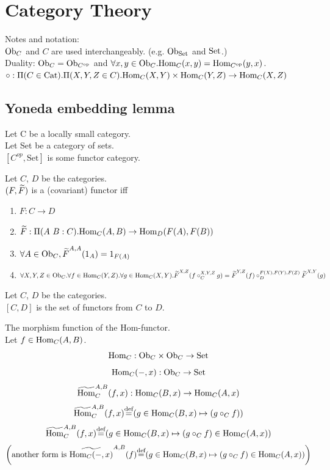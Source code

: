 \documentclass[10pt,a4paper]{article}
\begin{document}
\section{Category Theory}
Notes and notation:\\
${\textrm{Ob}}_C$ and $C$ are used interchangeably. (e.g. ${\textrm{Ob}}_{\textrm{Set}}$ and ${\textrm{Set}}$.)\\
Duality: ${\textrm{Ob}}_C = {\textrm{Ob}}_{C^{\textrm{op}}}$ and 
 $\forall x,y \in {\textrm{Ob}}_C. {\textrm{Hom}}_C(x,y) = {\textrm{Hom}}_{C^{\textrm{op}}}(y,x)$.\\
$\circ : \Pi(C\in {\textrm{Cat}}).\Pi(X,Y,Z\in C).{\textrm{Hom}}_C(X,Y)\times{\textrm{Hom}}_C(Y,Z)\to{\textrm{Hom}}_C(X,Z)$

\subsection{Yoneda embedding lemma}
Let C be a locally small category.\\
Let Set be a category of sets.\\
$[C^{op},\textrm{Set}]$ is some functor category.\\

\begin{definition}
Let $C$, $D$ be the categories.\\
 $(F, {\widetilde{F}\textrm{}})$ is a (covariant) functor iff\\
\begin{enumerate}
\item $F:C \to D$
\item ${\widetilde{F}\textrm{}}:\Pi(A\ B:C).{\textrm{Hom}}_C(A,B) \to {\textrm{Hom}}_D(F(A), F(B))$
\item $\forall A\in {\textrm{Ob}}_C, {\widetilde{F}\textrm{}}^{A,A}(1_A)=1_{F(A)}$
\item $\forall X,Y,Z \in {\textrm{Ob}}_C.\forall f\in{\textrm{Hom}}_C(Y,Z).\forall g\in{\textrm{Hom}}_C(X,Y). {\widetilde{F}\textrm{}}^{X,Z}(f\circ_C^{X,Y,Z} g)={\widetilde{F}\textrm{}}^{Y,Z}(f)\circ_D^{F(X),F(Y),F(Z)} {\widetilde{F}\textrm{}}^{X,Y}(g)$
\end{enumerate}

\end{definition}

\begin{definition}
Let $C$, $D$ be the categories.\\
$[C,D]$ is the set of functors from $C$ to $D$.\\
\end{definition}

\begin{definition} The morphism function of the Hom-functor.\\
Let $f\in{\textrm{Hom}}_{C}(A,B)$.
$${\textrm{Hom}}_C: {\textrm{Ob}}_C \times {\textrm{Ob}}_C \to {\textrm{Set}}$$
$${\textrm{Hom}}_C(-,x): {\textrm{Ob}}_C \to {\textrm{Set}}$$
$${\widetilde{{\textrm{Hom}}}\textrm{}}^{A,B}_C(f,x) : {\textrm{Hom}}_C(B,x) \to {\textrm{Hom}}_C(A,x)$$
$${\widetilde{{\textrm{Hom}}}\textrm{}}^{A,B}_C(f,x) {\stackrel{{\textrm{def}}}{=}} (g \in{\textrm{Hom}}_C(B,x) \mapsto (g \circ_C f))$$
$${\widetilde{{\textrm{Hom}}}\textrm{}}^{A,B}_C(f,x) {\stackrel{{\textrm{def}}}{=}} (g \in{\textrm{Hom}}_C(B,x) \mapsto (g \circ_C f) \in{\textrm{Hom}}_C(A,x))$$
$$\left(\textrm{another form is }\widetilde{{\textrm{Hom}}_C(-,x)}^{A,B}(f) {\stackrel{{\textrm{def}}}{=}} (g \in{\textrm{Hom}}_C(B,x) \mapsto (g \circ_C f) \in{\textrm{Hom}}_C(A,x))\right)$$
\end{definition}
\end{document}
